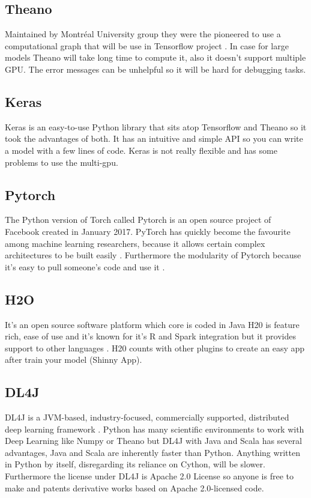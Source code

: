 \subsection[Theano]{Theano}
Maintained by Montréal University group \cite{specificcomparaison} they were the pioneered to use a computational graph that will be use in Tensorflow project \cite{generalcomparaison}. In case for large models Theano will take long time to compute it, also it doesn't support multiple GPU. The error messages can be unhelpful so it will be hard for debugging tasks.

\subsection[Keras]{Keras}
Keras is an easy-to-use Python library \cite{specificcomparaison}
that sits atop Tensorflow and Theano so it took the advantages of both. It has an intuitive and simple API so you can write a model with a few lines of code. Keras is not really flexible and has some problems to use the multi-gpu. 

\subsection[Pytorch]{Pytorch}
The Python version of Torch called Pytorch is an open source project of Facebook created in January 2017. PyTorch has quickly become the favourite among machine learning researchers, because it allows certain complex architectures to be built easily  \cite{generalcomparaison}. Furthermore the modularity of Pytorch because it's easy to pull someone's code and use it \cite{specificcomparaison}. 

\subsection[H20]{H2O}
It's an open source software platform which core is coded in Java \cite{h20-deeplearning}
H20 is feature rich, ease of use and it's known for it's R and Spark integration but it provides support to other languages \cite{h20-comparative-table}.
H20 counts with other plugins to create an easy app after train your model (Shinny App).
 
\subsection[DL4J]{DL4J}
DL4J is a JVM-based, industry-focused, commercially supported, distributed deep learning framework \cite{generalcomparaison}. Python has many scientific environments to work with Deep Learning like Numpy or Theano but DL4J with Java and Scala has several advantages,
Java and Scala are inherently faster than Python. Anything written in Python by itself, disregarding its reliance on Cython, will be slower.
Furthermore the license under DL4J is Apache 2.0 License so anyone is free to make and patents derivative works based on Apache 2.0-licensed code. 

